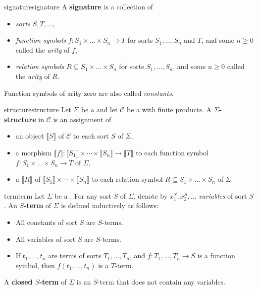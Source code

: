 \begin{topic}{signature}{signature}
    A \textbf{signature} is a collection of
    \begin{itemize}
        \item \textit{sorts} $S, T, \ldots$, 
        \item \textit{function symbols} $f \colon S_1 \times \ldots \times S_n \to T$ for sorts $S_1, \ldots, S_n$ and $T$, and some $n \ge 0$ called the \textit{arity} of $f$,
        \item \textit{relation symbols} $R \subseteq S_1 \times \ldots \times S_n$ for sorts $S_1, \ldots, S_n$, and some $n \ge 0$ called the \textit{arity} of $R$.
    \end{itemize}
    Function symbols of arity zero are also called \textit{constants}.
\end{topic}

\begin{topic}{structure}{structure}
    Let $\Sigma$ be a  and let $\mathcal{C}$ be a  with finite products. A \textbf{$\Sigma$-structure} in $\mathcal{C}$ is an assignment of
    \begin{itemize}
        \item an object $\llbracket S \rrbracket$ of $\mathcal{C}$ to each sort $S$ of $\Sigma$,
        \item a morphism $\llbracket f \rrbracket \colon \llbracket S_1 \rrbracket \times \cdots \times \llbracket S_n \rrbracket \to \llbracket T \rrbracket$ to each function symbol $f \colon S_1 \times \ldots \times S_n \to T$ of $\Sigma$,
        \item a  $\llbracket R \rrbracket$ of $\llbracket S_1 \rrbracket \times \cdots \times \llbracket S_n \rrbracket$ to each relation symbol $R \subseteq S_1 \times \ldots \times S_n$ of $\Sigma$.
    \end{itemize}
\end{topic}

\begin{topic}{term}{term}
    Let $\Sigma$ be a . For any sort $S$ of $\Sigma$, denote by $x_1^S, x_2^S, \ldots$ \textit{variables} of sort $S$. An \textbf{$S$-term} of $\Sigma$ is defined inductively as follows:
    \begin{itemize}
        \item All constants of sort $S$ are $S$-terms.
        \item All variables of sort $S$ are $S$-terms.
        \item If $t_1, \ldots, t_n$ are terms of sorts $T_1, \ldots, T_n$, and $f \colon T_1, \ldots, T_n \to S$ is a function symbol, then $f(t_1, \ldots, t_n)$ is a $T$-term.
    \end{itemize}
    A \textbf{closed $S$-term} of $\Sigma$ is an $S$-term that does not contain any variables.
\end{topic}

